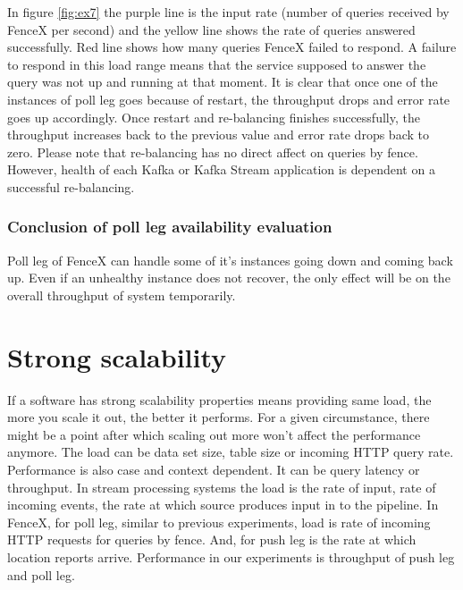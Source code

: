 \documentclass[a4]{report}
\begin{document}
    In figure \ref{fig:ex7} the purple line is the input rate (number of queries received by FenceX per
    second) and the yellow line shows the rate of queries answered successfully.
    Red line shows how many queries FenceX failed to respond.
    A failure to respond in this load range means that the service supposed to answer the query was not
    up and running at that moment.
    It is clear that once one of the instances of poll leg goes because of restart, the throughput drops and error
    rate goes up accordingly.
    Once restart and re-balancing finishes successfully, the throughput increases back to the previous
    value and error rate drops back to zero.
    Please note that re-balancing has no direct affect on queries by fence.
    However, health of each Kafka or Kafka Stream application is dependent on a successful re-balancing.

    \subsubsection{Conclusion of poll leg availability evaluation}
    Poll leg of FenceX can handle some of it's instances going down and coming back up.
    Even if an unhealthy instance does not recover, the only effect will be on the overall throughput of system
    temporarily.


    \section{Strong scalability}
    If a software has strong scalability properties means providing same load, the more you scale it out, the better
    it performs.
    For a given circumstance, there might be a point after which scaling out more won't affect the performance anymore.
    The load can be data set size, table size or incoming HTTP query rate.
    Performance is also case and context dependent.
    It can be query latency or throughput.
    In stream processing systems the load is the rate of input, rate of incoming events, the rate at
    which source produces input in to the pipeline.
    In FenceX, for poll leg, similar to previous experiments, load is rate of incoming HTTP requests for queries by
    fence.
    And, for push leg is the rate at which location reports arrive.
    Performance in our experiments is throughput of push leg and poll leg.
\end{document}
